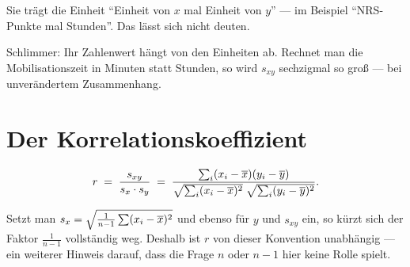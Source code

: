 \begin{warnung}
Sie trägt die Einheit \enquote{Einheit von $x$ mal Einheit von $y$} --- im Beispiel \enquote{NRS-Punkte mal Stunden}. Das lässt sich nicht deuten.

Schlimmer: Ihr Zahlenwert hängt von den Einheiten ab. Rechnet man die Mobilisationszeit in Minuten statt Stunden, so wird $s_{xy}$ sechzigmal so groß --- bei unverändertem Zusammenhang.

\begin{center}
\begin{minipage}{0.88\textwidth}
\end{minipage}
\end{center}
\end{warnung}

\section{Der Korrelationskoeffizient}

\begin{definition}
\[ r \;=\; \frac{s_{xy}}{s_x \cdot s_y} \;=\; \frac{\sum_i (x_i-\overline{x})(y_i-\overline y)}{\sqrt{\sum_i (x_i-\overline{x})^2}\;\sqrt{\sum_i (y_i-\overline y)^2}} . \]
\end{definition}

\begin{merksatz}
Setzt man $s_x = \sqrt{\frac{1}{n-1}\sum(x_i-\overline{x})^2}$ und ebenso für $y$ und $s_{xy}$ ein, so kürzt sich der Faktor $\frac{1}{n-1}$ vollständig weg. Deshalb ist $r$ von dieser Konvention unabhängig --- ein weiterer Hinweis darauf, dass die Frage $n$ oder $n-1$ hier keine Rolle spielt.
\end{merksatz}

